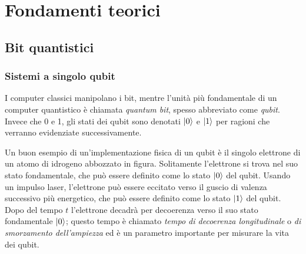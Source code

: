 \chapter{Fondamenti teorici}\label{ch:teoria}


\section{Bit quantistici}

\subsection{Sistemi a singolo qubit}

I computer classici manipolano i bit, mentre l'unità più fondamentale di un computer quantistico 
è chiamata \emph{quantum bit}, spesso abbreviato come \emph{qubit}. 
Invece che 0 e 1, gli stati dei qubit sono denotati $\ket{0}$ e $\ket{1}$ per ragioni che verranno 
evidenziate successivamente. 

Un buon esempio di un'implementazione fisica di un qubit è il singolo elettrone di un atomo di 
idrogeno abbozzato in figura. %
Solitamente l'elettrone si trova %
nel suo stato fondamentale, che può essere definito come lo stato $\ket{0}$ del qubit. 
Usando un impulso laser, l'elettrone può essere eccitato verso il guscio di valenza successivo più 
energetico, che può essere definito come lo stato $\ket{1}$  del qubit. Dopo del tempo $t$ 
l'elettrone decadrà per decoerenza verso il suo stato fondamentale $\ket{0}$; questo tempo è 
chiamato \emph{tempo di decoerenza longitudinale} o \emph{di smorzamento dell'ampiezza} ed è 
un parametro importante per misurare la vita dei qubit. %


